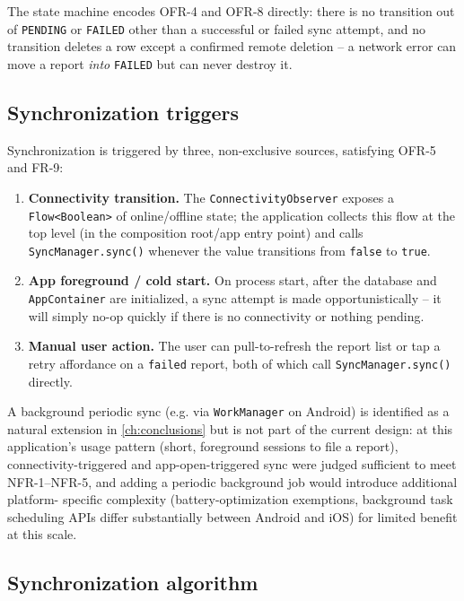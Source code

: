 The state machine encodes OFR-4 and OFR-8 directly: there is no transition
out of \texttt{PENDING} or \texttt{FAILED} other than a successful or
failed sync attempt, and no transition deletes a row except a confirmed
remote deletion -- a network error can move a report \emph{into}
\texttt{FAILED} but can never destroy it.

\subsection{Synchronization triggers}
\label{sec:sync-triggers}

Synchronization is triggered by three, non-exclusive sources, satisfying
OFR-5 and FR-9:

\begin{enumerate}
  \item \textbf{Connectivity transition.} The \texttt{ConnectivityObserver}
  exposes a \texttt{Flow<Boolean>} of online/offline state; the
  application collects this flow at the top level (in the composition
  root/app entry point) and calls \texttt{SyncManager.sync()} whenever the
  value transitions from \texttt{false} to \texttt{true}.
  \item \textbf{App foreground / cold start.} On process start, after the
  database and \texttt{AppContainer} are initialized, a sync attempt is
  made opportunistically -- it will simply no-op quickly if there is no
  connectivity or nothing pending.
  \item \textbf{Manual user action.} The user can pull-to-refresh the
  report list or tap a retry affordance on a \texttt{failed} report, both
  of which call \texttt{SyncManager.sync()} directly.
  \end{enumerate}

A background periodic sync (e.g. via \texttt{WorkManager} on Android) is
identified as a natural extension in \cref{ch:conclusions} but is not part
of the current design: at this application's usage pattern (short,
foreground sessions to file a report), connectivity-triggered and
app-open-triggered sync were judged sufficient to meet NFR-1--NFR-5, and
adding a periodic background job would introduce additional platform-
specific complexity (battery-optimization exemptions, background task
scheduling APIs differ substantially between Android and iOS) for limited
benefit at this scale.

\subsection{Synchronization algorithm}
\label{sec:sync-algorithm}

